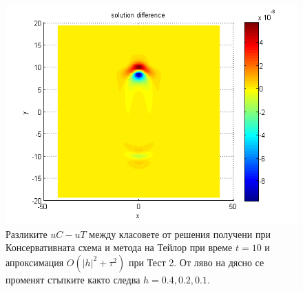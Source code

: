 \documentclass{article}
\begin{document}
\begin{figure}[ht]
\begin{minipage}[b]{0.32\linewidth}
		\includegraphics[width=\linewidth]{../amitans/figures/compare_128_bt1_c09_h010.png}
	\end{minipage}
\caption{Разликите $uC - uT$  между класовете от решения получени при Консервативната схема и метода на Тейлор при време $t=10$ и апроксимация $O(|h|^2 + \tau^2)$ при Тест 2. От ляво на дясно се променят стъпките както следва $h=0.4, 0.2, 0.1$.}
\label{Test2_Diff}
\end{figure}
\end{document}
